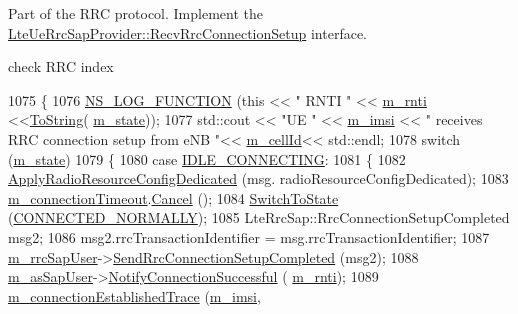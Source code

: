 Part of the R\+RC protocol. Implement the \hyperlink{classns3_1_1LteUeRrcSapProvider_aad40c881f56b67a46fed66e19e7e6ab0}{Lte\+Ue\+Rrc\+Sap\+Provider\+::\+Recv\+Rrc\+Connection\+Setup} interface. 

check R\+RC index 
\begin{DoxyCode}
1075 \{
1076   \hyperlink{log-macros-disabled_8h_a90b90d5bad1f39cb1b64923ea94c0761}{NS\_LOG\_FUNCTION} (\textcolor{keyword}{this} << \textcolor{stringliteral}{" RNTI "} << \hyperlink{classns3_1_1LteUeRrc_a8e078d8ef0ad23e670fe2ef08caab84f}{m\_rnti} <<\hyperlink{namespacens3_a3d1f7e1bec1972e2ae8d64673fcfcd9c}{ToString}(
      \hyperlink{classns3_1_1LteUeRrc_a81d711739d758a5add38b100086be632}{m\_state}));
1077   std::cout << \textcolor{stringliteral}{"UE "} << \hyperlink{classns3_1_1LteUeRrc_a1d825677309d17bdf729920f7dafd011}{m\_imsi} << \textcolor{stringliteral}{" receives RRC connection setup from eNB "}<<
      \hyperlink{classns3_1_1LteUeRrc_aa9d3317734eea9158371d9fccf3a0c48}{m\_cellId}<< std::endl;
1078   \textcolor{keywordflow}{switch} (\hyperlink{classns3_1_1LteUeRrc_a81d711739d758a5add38b100086be632}{m\_state})
1079     \{
1080     \textcolor{keywordflow}{case} \hyperlink{classns3_1_1LteUeRrc_a241012c291e75681150c9214e11f6145a05fd8fd51a5d6c77e6927bd575cfd5e4}{IDLE\_CONNECTING}:
1081       \{
1082         \hyperlink{classns3_1_1LteUeRrc_af7c2bc93366a56a35793c3ef6bce5ce3}{ApplyRadioResourceConfigDedicated} (msg.
      radioResourceConfigDedicated);
1083         \hyperlink{classns3_1_1LteUeRrc_ab8f41a26e439cf7619c04ef4950d5f9f}{m\_connectionTimeout}.\hyperlink{classns3_1_1EventId_a993ae94e48e014e1afd47edb16db7a11}{Cancel} ();
1084         \hyperlink{classns3_1_1LteUeRrc_a15f1bea4c3c8d3f9949b234c0cfa12e6}{SwitchToState} (\hyperlink{classns3_1_1LteUeRrc_a241012c291e75681150c9214e11f6145a29dc4c52bd374f1b78508fb725de9999}{CONNECTED\_NORMALLY});
1085         LteRrcSap::RrcConnectionSetupCompleted msg2;
1086         msg2.rrcTransactionIdentifier = msg.rrcTransactionIdentifier;  
1087         \hyperlink{classns3_1_1LteUeRrc_a9636e38d20aa1d75c9423d43648f2a1a}{m\_rrcSapUser}->\hyperlink{classns3_1_1LteUeRrcSapUser_a951f98059d74508b5d419e6144d062c6}{SendRrcConnectionSetupCompleted} (msg2);
1088         \hyperlink{classns3_1_1LteUeRrc_aef8b3b6b1b1527ce6946472d1c1888dc}{m\_asSapUser}->\hyperlink{classns3_1_1LteAsSapUser_a78cc4b7b3ff069c3aeaab9a9be86e396}{NotifyConnectionSuccessful} (
      \hyperlink{classns3_1_1LteUeRrc_a8e078d8ef0ad23e670fe2ef08caab84f}{m\_rnti});
1089         \hyperlink{classns3_1_1LteUeRrc_a698ac3b66bd6073dcab222d72bf2745e}{m\_connectionEstablishedTrace} (\hyperlink{classns3_1_1LteUeRrc_a1d825677309d17bdf729920f7dafd011}{m\_imsi}, 

\end{DoxyCode}
